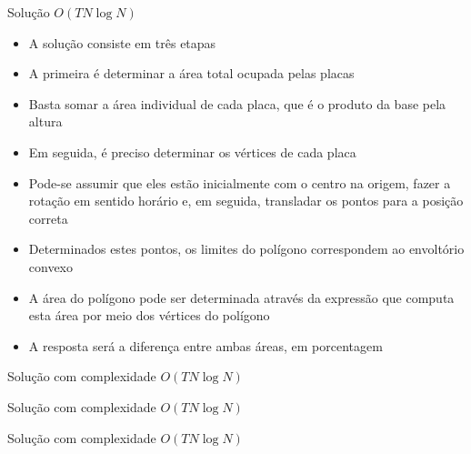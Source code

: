 \begin{frame}[fragile]{Solução $O(TN\log N)$}

    \begin{itemize}
        \item A solução consiste em três etapas
        \pause

        \item A primeira é determinar a área total ocupada pelas placas
        \pause

        \item Basta somar a área individual de cada placa, que é o produto da base pela altura
        \pause

        \item Em seguida, é preciso determinar os vértices de cada placa
        \pause

        \item Pode-se assumir que eles estão inicialmente com o centro na origem, fazer a 
            rotação em sentido horário e, em seguida, transladar os pontos para a posição
            correta
        \pause

        \item Determinados estes pontos, os limites do polígono correspondem ao envoltório
            convexo
        \pause

        \item A área do polígono pode ser determinada através da expressão que computa esta
            área por meio dos vértices do polígono
        \pause

        \item A resposta será a diferença entre ambas áreas, em porcentagem
    \end{itemize}

\end{frame}

\begin{frame}[fragile]{Solução com complexidade $O(TN\log N)$}
\end{frame}

\begin{frame}[fragile]{Solução com complexidade $O(TN\log N)$}
\end{frame}

\begin{frame}[fragile]{Solução com complexidade $O(TN\log N)$}
\end{frame}

